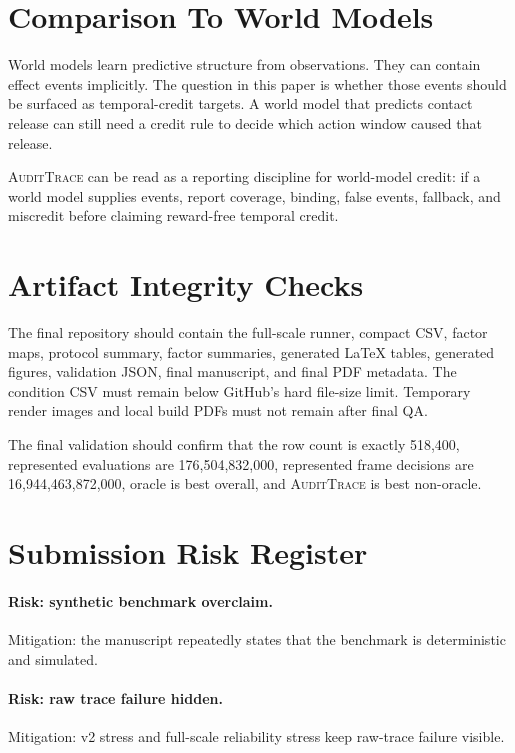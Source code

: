 \documentclass{article}
\newcommand{\method}{\textsc{AuditTrace}\xspace}
\begin{document}
\section{Comparison To World Models}

World models learn predictive structure from observations. They can contain effect events implicitly. The question in this paper is whether those events should be surfaced as temporal-credit targets. A world model that predicts contact release can still need a credit rule to decide which action window caused that release.

\method can be read as a reporting discipline for world-model credit: if a world model supplies events, report coverage, binding, false events, fallback, and miscredit before claiming reward-free temporal credit.

\section{Artifact Integrity Checks}

The final repository should contain the full-scale runner, compact CSV, factor maps, protocol summary, factor summaries, generated LaTeX tables, generated figures, validation JSON, final manuscript, and final PDF metadata. The condition CSV must remain below GitHub's hard file-size limit. Temporary render images and local build PDFs must not remain after final QA.

The final validation should confirm that the row count is exactly 518,400, represented evaluations are 176,504,832,000, represented frame decisions are 16,944,463,872,000, oracle is best overall, and \method is best non-oracle.

\section{Submission Risk Register}

\paragraph{Risk: synthetic benchmark overclaim.}
Mitigation: the manuscript repeatedly states that the benchmark is deterministic and simulated.

\paragraph{Risk: raw trace failure hidden.}
Mitigation: v2 stress and full-scale reliability stress keep raw-trace failure visible.
\end{document}
